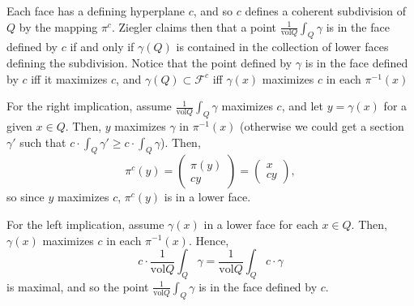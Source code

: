 \documentclass[12pt,a4paper]{article}
\newcommand{\vol}{\text{vol}}
\begin{document}
Each face has a defining hyperplane $c$, and so $c$ defines a coherent subdivision of $Q$ by the mapping $\pi^c$. Ziegler claims then that a point $\frac{1}{\vol Q}\int_Q \gamma$ is in the face defined by $c$ if and only if $\gamma(Q)$ is contained in the collection of lower faces defining the subdivision.
Notice that the point defined by $\gamma$ is in the face defined by $c$ iff it maximizes $c$, and $\gamma(Q)\subset \mathcal{F}^c$ iff $\gamma(x)$ maximizes $c$ in each $\pi^{-1}(x)$

For the right implication, assume $\frac{1}{\vol Q}\int_Q\gamma$ maximizes $c$, and let $y=\gamma(x)$ for a given $x\in Q$. Then, $y$ maximizes $\gamma$ in $\pi^{-1}(x)$ (otherwise we could get a section $\gamma'$ such that $c\cdot \int_Q \gamma' \geq c \cdot \int_Q \gamma$). Then, $$\pi^c(y)=\left( \begin{array}{c}\pi(y)\\cy \end{array}\right)=\left( \begin{array}{c}x\\cy \end{array}\right),$$
so since $y$ maximizes $c$, $\pi^c(y)$ is in a lower face. 

For the left implication, assume $\gamma(x)$ in a lower face for each $x\in Q$. Then, $\gamma(x)$ maximizes $c$ in each $\pi^{-1}(x)$. Hence, $$c\cdot \frac{1}{\vol Q}\int_Q \gamma = \frac{1}{\vol Q}\int_Q c\cdot \gamma$$ is maximal, and so the point $\frac{1}{\vol Q}\int_Q \gamma$ is in the face defined by $c$.
\end{document}
